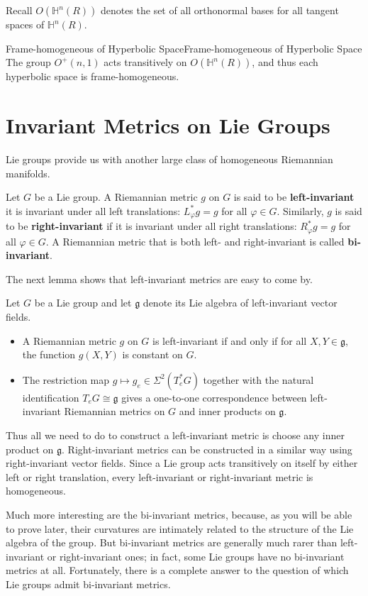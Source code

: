 \documentclass[../main.tex]{subfiles}
\begin{document}
Recall $O(\mathbb{H}^n(R))$ denotes the set of all orthonormal bases for all tangent spaces of $\mathbb{H}^n(R)$.

\begin{proposition}{Frame-homogeneous of Hyperbolic Space}{Frame-homogeneous of Hyperbolic Space}
  The group $O^+(n,1)$ acts transitively on $O(\mathbb{H}^n(R))$, and thus each hyperbolic space is frame-homogeneous.
\end{proposition}


\section{Invariant Metrics on Lie Groups}
Lie groups provide us with another large class of homogeneous Riemannian manifolds.

Let $G$ be a Lie group. A Riemannian metric $g$ on $G$ is said to be \textbf{left-invariant} it is invariant under all left translations: $L_\varphi^* g = g$ for all $\varphi \in G$. Similarly, $g$ is said to be \textbf{right-invariant} if it is invariant under all right translations: $R_\varphi^* g = g$ for all $\varphi \in G$. A Riemannian metric that is both left- and right-invariant is called \textbf{bi-invariant}.

The next lemma shows that left-invariant metrics are easy to come by.

\begin{lemma}{}{}
  Let $G$ be a Lie group and let $\mathfrak{g}$ denote its Lie algebra of left-invariant vector fields.
  \begin{itemize}
    \item A Riemannian metric $g$ on $G$ is left-invariant if and only if for all $X, Y \in \mathfrak{g}$, the function $g(X,Y)$ is constant on $G$.
    \item The restriction map $g \mapsto g_e \in \Sigma^2(T_e^* G)$ together with the natural identification $T_e G \cong \mathfrak{g}$ gives a one-to-one correspondence between left-invariant Riemannian metrics on $G$ and inner products on $\mathfrak{g}$.
  \end{itemize}
\end{lemma}

Thus all we need to do to construct a left-invariant metric is choose any inner product on $\mathfrak{g}$. Right-invariant metrics can be constructed in a similar way using right-invariant vector fields. Since a Lie group acts transitively on itself by either left or right translation, every left-invariant or right-invariant metric is homogeneous.

\begin{remark}
  Much more interesting are the bi-invariant metrics, because, as you will be able to prove later, their curvatures are intimately related to the structure of the Lie algebra of the group. But bi-invariant metrics are generally much rarer than left-invariant or right-invariant ones; in fact, some Lie groups have no bi-invariant metrics at all. Fortunately, there is a complete answer to the question of which Lie groups admit bi-invariant metrics.
\end{remark}
\end{document}
